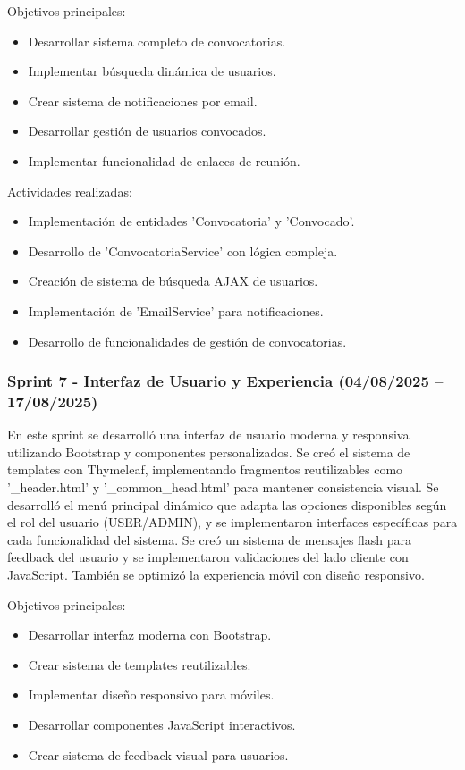 Objetivos principales:
\begin{itemize}
\tightlist
\item
Desarrollar sistema completo de convocatorias.
\item
Implementar búsqueda dinámica de usuarios.
\item
Crear sistema de notificaciones por email.
\item
Desarrollar gestión de usuarios convocados.
\item
Implementar funcionalidad de enlaces de reunión.
\end{itemize}

Actividades realizadas:
\begin{itemize}
\tightlist
\item
Implementación de entidades 'Convocatoria' y 'Convocado'.
\item
Desarrollo de 'ConvocatoriaService' con lógica compleja.
\item
Creación de sistema de búsqueda AJAX de usuarios.
\item
Implementación de 'EmailService' para notificaciones.
\item
Desarrollo de funcionalidades de gestión de convocatorias.
\end{itemize}


\subsubsection{Sprint 7 - Interfaz de Usuario y Experiencia (04/08/2025 – 17/08/2025)} 
En este sprint se desarrolló una interfaz de usuario moderna y responsiva utilizando Bootstrap y componentes personalizados. Se creó el sistema de templates con Thymeleaf, implementando fragmentos reutilizables como '_header.html' y '_common_head.html' para mantener consistencia visual. Se desarrolló el menú principal dinámico que adapta las opciones disponibles según el rol del usuario (USER/ADMIN), y se implementaron interfaces específicas para cada funcionalidad del sistema. Se creó un sistema de mensajes flash para feedback del usuario y se implementaron validaciones del lado cliente con JavaScript. También se optimizó la experiencia móvil con diseño responsivo.

Objetivos principales:
\begin{itemize}
\tightlist
\item
Desarrollar interfaz moderna con Bootstrap.
\item
Crear sistema de templates reutilizables.
\item
Implementar diseño responsivo para móviles.
\item
Desarrollar componentes JavaScript interactivos.
\item
Crear sistema de feedback visual para usuarios.
\end{itemize}

